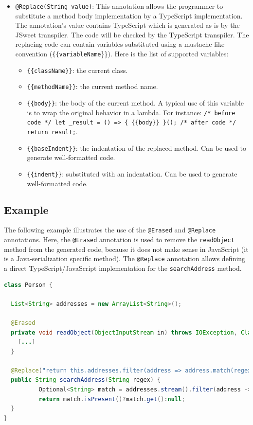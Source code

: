 \documentclass[a4paper]{report}
\begin{document}
\begin{itemize}
\item \texttt{@Replace(String value)}:  This annotation allows the programmer to substitute a method body implementation by a TypeScript implementation. The annotation's value contains TypeScript which is generated as is by the JSweet transpiler. The code will be checked by the TypeScript transpiler. The replacing code can contain variables substituted using a mustache-like convention (\texttt{\{\{variableName}\}\}). Here is the list of supported variables:
\begin{itemize}
\item \texttt{\{\{className\}\}}: the current class.
\item \texttt{\{\{methodName\}\}}: the current method name.
\item \texttt{\{\{body\}\}}: the body of the current method. A typical use of this variable
 is to wrap the original behavior in a lambda. For instance:
 \texttt{/* before code */ let \_result = () => \{ \{\{body\}\} \}(); /* after code */ return result;}.
\item \texttt{\{\{baseIndent\}\}}: the indentation of the replaced method. Can be used to generate well-formatted code.
\item \texttt{\{\{indent\}\}}: substituted with an indentation. Can be used to generate well-formatted code.
\end{itemize}
\end{itemize}

\subsection{Example}

The following example illustrates the use of the \texttt{@Erased} and \texttt{@Replace} annotations. Here, the \texttt{@Erased} annotation is used to remove the \texttt{readObject} method from the generated code, because it does not make sense in JavaScript (it is a Java-serialization specific method). The \texttt{@Replace} annotation allows defining a direct TypeScript/JavaScript implementation for the \texttt{searchAddress} method.

\begin{lstlisting}[language=Java]
class Person {

  List<String> addresses = new ArrayList<String>();

  @Erased
  private void readObject(ObjectInputStream in) throws IOException, ClassNotFoundException {
    [...]
  }

  @Replace("return this.addresses.filter(address => address.match(regex))[0]")
  public String searchAddress(String regex) {
          Optional<String> match = addresses.stream().filter(address -> address.matches(regex)).findFirst();
          return match.isPresent()?match.get():null;
  }
}
\end{lstlisting}
\end{document}
